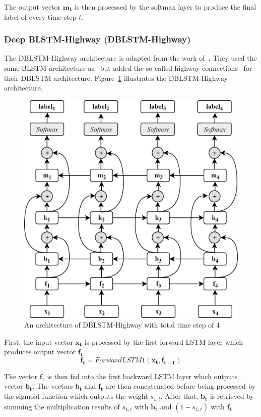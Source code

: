 The output vector $\mathbf{m_{t}}$ is then processed by the softmax layer to produce the final label of every time step $t$.

\subsubsection{Deep BLSTM-Highway (DBLSTM-Highway)}
The DBLSTM-Highway architecture is adapted from the work of~\cite{he2017deep}. They used the same BLSTM architecture as~\cite{zhou2015end} but added the so-called highway connections~\citep{srivastava2015training} for their DBLSTM architecture. Figure~\ref{fig:dblstmhighway} illustrates the DBLSTM-Highway architecture.

\begin{figure}
	\centering
	\includegraphics[width=0.75\linewidth]{images/dblstmhighway}
	\caption{An architecture of DBLSTM-Highway with total time step of 4}
	\label{fig:dblstmhighway}
\end{figure}

First, the input vector $\mathbf{x_{t}}$ is processed by the first forward LSTM layer which produces output vector $\mathbf{f_{t}}$.
\begin{equation}
\label{eq:forwardhighway1}
\mathbf{f_{t}} = ForwardLSTM1(\mathbf{x_{t}}, \mathbf{f_{t-1}})
\end{equation}

The vector $\mathbf{f_{t}}$ is then fed into the first backward LSTM layer which outputs vector $\mathbf{b_{t}}$. The vectors $\mathbf{b_{t}}$ and $\mathbf{f_{t}}$ are then concatenated before being processed by the sigmoid function which outputs the weight $s_{1,t}$. After that, $\mathbf{b_{t}}$ is retrieved by summing the multiplication results of $s_{1,t}$ with $\mathbf{b_{t}}$ and $(1 - s_{1,t})$ with $\mathbf{f_{t}}$

